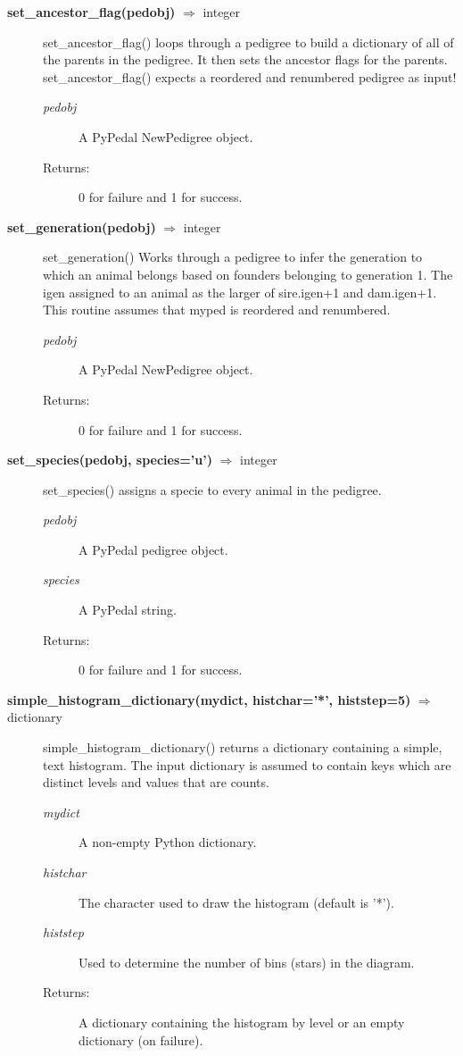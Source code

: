 \begin{description}
\item[\textbf{set\_ancestor\_flag(pedobj)} $\Rightarrow$ integer]
set\_ancestor\_flag() loops through a pedigree to build a dictionary of all of the parents in the pedigree. It then sets the ancestor flags for the parents. set\_ancestor\_flag() expects a reordered and renumbered pedigree as input!
\begin{description}
\item[\emph{pedobj}] A PyPedal NewPedigree object.
\item[Returns:] 0 for failure and 1 for success.
\end{description}

\item[\textbf{set\_generation(pedobj)} $\Rightarrow$ integer]
set\_generation() Works through a pedigree to infer the generation to which an animal belongs based on founders belonging to generation 1. The igen assigned to an animal as the larger of sire.igen+1 and dam.igen+1. This routine assumes that myped is reordered and renumbered.
\begin{description}
\item[\emph{pedobj}] A PyPedal NewPedigree object.
\item[Returns:] 0 for failure and 1 for success.
\end{description}

\item[\textbf{set\_species(pedobj, species='u')} $\Rightarrow$ integer]
set\_species() assigns a specie to every animal in the pedigree.
\begin{description}
\item[\emph{pedobj}] A PyPedal pedigree object.
\item[\emph{species}] A PyPedal string.
\item[Returns:] 0 for failure and 1 for success.
\end{description}

\item[\textbf{simple\_histogram\_dictionary(mydict, histchar='*', histstep=5)} $\Rightarrow$ dictionary]
simple\_histogram\_dictionary() returns a dictionary containing a simple, text histogram. The input dictionary is assumed to contain keys which are distinct levels and values that are counts.
\begin{description}
\item[\emph{mydict}] A non-empty Python dictionary.
\item[\emph{histchar}] The character used to draw the histogram (default is '*').
\item[\emph{histstep}] Used to determine the number of bins (stars) in the diagram.
\item[Returns:] A dictionary containing the histogram by level or an empty dictionary (on failure).
\end{description}


\end{description}
